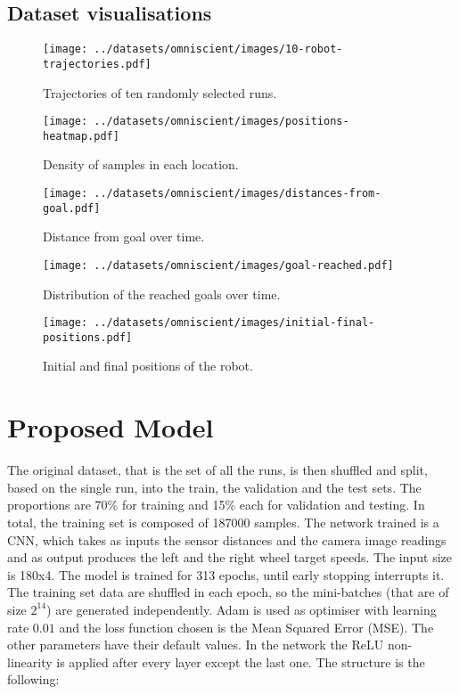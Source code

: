 \documentclass[conference]{IEEEtran}
\begin{document}
\subsection{Dataset visualisations}
\begin{figure}[htbp]
	\centerline{\texttt{[image: ../datasets/omniscient/images/10-robot-trajectories.pdf]}}
	\caption{Trajectories of ten randomly selected runs.}
	\label{fig:trajectories-omniscient}
\end{figure}

\begin{figure}[htbp]
	\centerline{\texttt{[image: ../datasets/omniscient/images/positions-heatmap.pdf]}}
	\caption{Density of samples in each location.}
	\label{fig:densisy-omniscient}
\end{figure}

\begin{figure}[htbp]
	\centerline{\texttt{[image: ../datasets/omniscient/images/distances-from-goal.pdf]}}
	\caption{Distance from goal over time.}
	\label{fig:distance-from-goal-omniscient}
\end{figure}

\begin{figure}[htbp]
	\centerline{\texttt{[image: ../datasets/omniscient/images/goal-reached.pdf]}}
	\caption{Distribution of the reached goals over time.}
	\label{fig:goal-reached-omniscient}
\end{figure}

\begin{figure}[htbp]
	\centerline{\texttt{[image: ../datasets/omniscient/images/initial-final-positions.pdf]}}
	\caption{Initial and final positions of the robot.}
	\label{fig:initial-final-positions-omniscient}
\end{figure}


\section{Proposed Model}
The original dataset, that is the set of all the runs, is then shuffled and split, based on the single run, into the 
train, the validation and the test sets. The proportions are 70\% for training and 15\% each for validation and 
testing. In total, the training set is composed of 187000 samples.
The network trained is a CNN,  which takes as inputs the sensor distances and the camera image readings and as output 
produces the left and the right wheel target speeds. 
The input size is 180x4. The model is trained for 313 epochs, until early stopping interrupts it. 
The training set data are shuffled in each epoch, so the mini-batches (that are of size $2^14$) are generated 
independently. 
Adam is used as optimiser with learning rate $0.01$ and the loss function chosen is the Mean Squared Error (MSE). The 
other parameters have their default values. 
In the network the ReLU non-linearity is applied after every layer except the last one. 
The structure is the following:
\end{document}
